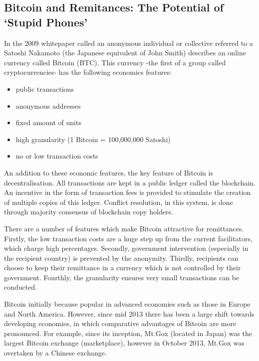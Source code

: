 \begin{refsection}
\chapter{Bitcoin and Remitances: The Potential of `Stupid Phones'}
\label{btc}
In the 2009 whitepaper \parencite{nakamoto2008bitcoin} called  an anonymous individual or collective referred to a Satoshi Nakamoto (the Japanese equivalent of John Smith) describes an online currency called Bitcoin (BTC). 
This currency -the first of a group called cryptocurrencies- has the following economics features:

\begin{itemize}
\item public transactions
\item anonymous addresses
\item fixed amount of units
\item high granularity (1 Bitcoin = 100,000,000 Satoshi)
\item no or low transaction costs
\end{itemize}

An addition to these economic features, the key feature of Bitcoin is decentralisation.
All transactions are kept in a public ledger called the blockchain. An incentive in the form of transaction fees is provided to stimulate the creation of multiple copies of this ledger.
Conflict resolution, in this system, is done through majority consensus of blockchain copy holders.

There are a number of features which make Bitcoin attractive for remittances. Firstly, the low transaction costs are a huge step up from the current facilitators, which charge high percentages. Secondly, government intervention (especially in the recipient country) is prevented by the anonymity. Thirdly, recipients can choose to keep their remittance in a currency which is not controlled by their government. Fourthly, the granularity ensures very small transactions can be conducted.

Bitcoin initially because popular in advanced economies such as those in Europe and North America.
However, since mid 2013 there has been a large shift towards developing economies,
in which comparative advantages of Bitcoin are more pronounced.
For example, since its inception, Mt.Gox (located in Japan) was the largest Bitcoin exchange (marketplace), however in October 2013, Mt.Gox was overtaken by a Chinese exchange.


\end{refsection}
